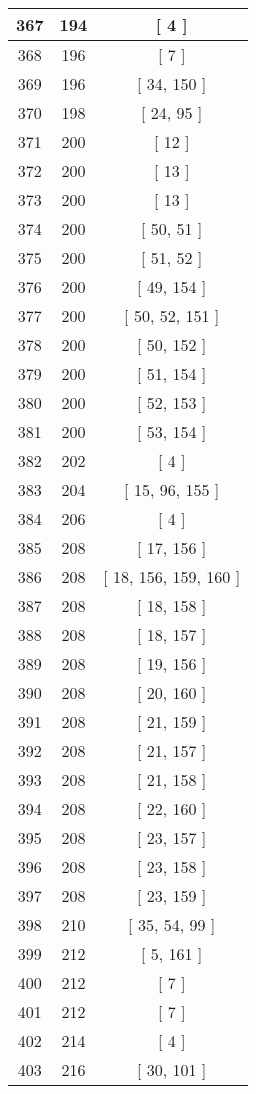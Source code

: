 \begin{center}
\begin{longtable}[H]{|| c c c ||}
367 & 194 & [ 4 ]
\\\hline
368 & 196 & [ 7 ]
\\\hline
369 & 196 & [ 34, 150 ]
\\\hline
370 & 198 & [ 24, 95 ]
\\\hline
371 & 200 & [ 12 ]
\\\hline
372 & 200 & [ 13 ]
\\\hline
373 & 200 & [ 13 ]
\\\hline
374 & 200 & [ 50, 51 ]
\\\hline
375 & 200 & [ 51, 52 ]
\\\hline
376 & 200 & [ 49, 154 ]
\\\hline
377 & 200 & [ 50, 52, 151 ]
\\\hline
378 & 200 & [ 50, 152 ]
\\\hline
379 & 200 & [ 51, 154 ]
\\\hline
380 & 200 & [ 52, 153 ]
\\\hline
381 & 200 & [ 53, 154 ]
\\\hline
382 & 202 & [ 4 ]
\\\hline
383 & 204 & [ 15, 96, 155 ]
\\\hline
384 & 206 & [ 4 ]
\\\hline
385 & 208 & [ 17, 156 ]
\\\hline
386 & 208 & [ 18, 156, 159, 160 ]
\\\hline
387 & 208 & [ 18, 158 ]
\\\hline
388 & 208 & [ 18, 157 ]
\\\hline
389 & 208 & [ 19, 156 ]
\\\hline
390 & 208 & [ 20, 160 ]
\\\hline
391 & 208 & [ 21, 159 ]
\\\hline
392 & 208 & [ 21, 157 ]
\\\hline
393 & 208 & [ 21, 158 ]
\\\hline
394 & 208 & [ 22, 160 ]
\\\hline
395 & 208 & [ 23, 157 ]
\\\hline
396 & 208 & [ 23, 158 ]
\\\hline
397 & 208 & [ 23, 159 ]
\\\hline
398 & 210 & [ 35, 54, 99 ]
\\\hline
399 & 212 & [ 5, 161 ]
\\\hline
400 & 212 & [ 7 ]
\\\hline
401 & 212 & [ 7 ]
\\\hline
402 & 214 & [ 4 ]
\\\hline
403 & 216 & [ 30, 101 ]

\end{longtable}
\end{center}
